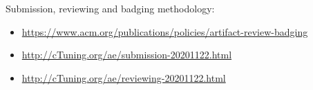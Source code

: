 \documentclass{sigplanconf}
\begin{document}
Submission, reviewing and badging methodology:

\begin{itemize}
  \item \url{https://www.acm.org/publications/policies/artifact-review-badging}
  \item \url{http://cTuning.org/ae/submission-20201122.html}
  \item \url{http://cTuning.org/ae/reviewing-20201122.html}
\end{itemize}

\end{document}
